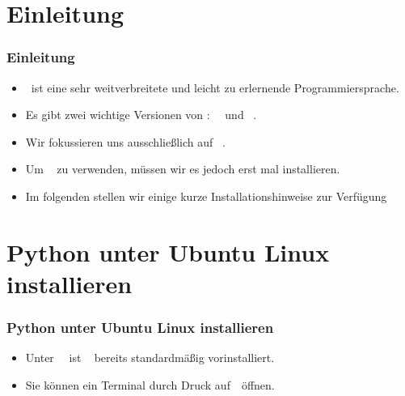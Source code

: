 \documentclass[aspectratio=169,mathserif,notheorems]{beamer}%
\subtitle{Python Installieren}%
\begin{document}
%
%
\startPresentation%
%
\section{Einleitung}%
%
\begin{frame}%
\frametitle{Einleitung}%
\begin{itemize}%
\item \python\ ist eine sehr weitverbreitete\cite{CBST2024LOHPPTDDSAMLA,B2023G2GLS} und leicht zu erlernende\cite{GPBS2006WCTIPIHSUP,VR1999CPFERPASEFTPOT} Programmiersprache.%
\item<2-> Es gibt zwei wichtige Versionen von \python:~\python~ und \python~.%
\item<3-> Wir fokussieren uns ausschließlich auf \python~.%
\item<4-> Um \python~ zu verwenden, müssen wir es jedoch erst mal installieren.%
\item<5-> Im folgenden stellen wir einige kurze Installationshinweise zur Verfügung
\end{itemize}%
\end{frame}%
%
\section{Python unter Ubuntu Linux installieren}%
%
\begin{frame}[t]%
\frametitle{Python unter Ubuntu Linux installieren}%
\begin{itemize}%
\item Unter \ubuntu\ \linux\ ist \python~ bereits standardmäßig vorinstalliert.%
\item<2-> Sie können ein Terminal\cite{B2022ELATCL} durch Druck auf~\ubuntuTerminal\ öffnen.%
\end{itemize}%
%
%
\end{frame}%
%
\end{document}
